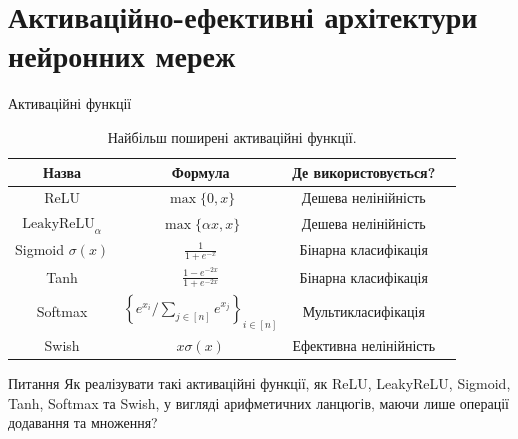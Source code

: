 \documentclass{zkdl-presentation-template}
\begin{document}
    \section{Активаційно-ефективні архітектури нейронних мереж}
    \begin{frame}{Активаційні функції}
        \begin{table}[H]
            \centering
            \begin{tabular}{cccc}
                \hline
                \textbf{Назва} & \textbf{Формула} & \textbf{Де використовується?} \\
                \hline
                ReLU & $\max\{0,x\}$ & Дешева нелінійність \\
                $\text{LeakyReLU}_{\alpha}$ & $\max\{\alpha x,x\}$ & Дешева нелінійність \\
                Sigmoid $\sigma(x)$ & $\frac{1}{1+e^{-x}}$ & Бінарна класифікація \\
                Tanh & $\frac{1-e^{-2x}}{1+e^{-2x}}$ & Бінарна класифікація \\
                Softmax & $\left\{e^{x_i}/\sum_{j\in [n]}e^{x_j}\right\}_{i \in [n]}$ & Мультикласифікація \\
                Swish & $x\sigma(x)$ & Ефективна нелінійність \\
                \hline
            \end{tabular}
            \caption{Найбільш поширені активаційні функції.}
            \label{table:activations}
        \end{table}

        \begin{alertblock}{Питання}
            Як реалізувати такі активаційні функції, як ReLU, LeakyReLU, Sigmoid,
            Tanh, Softmax та Swish, у вигляді арифметичних ланцюгів, маючи лише 
            операції додавання та множення?
        \end{alertblock}
    \end{frame}
\end{document}
